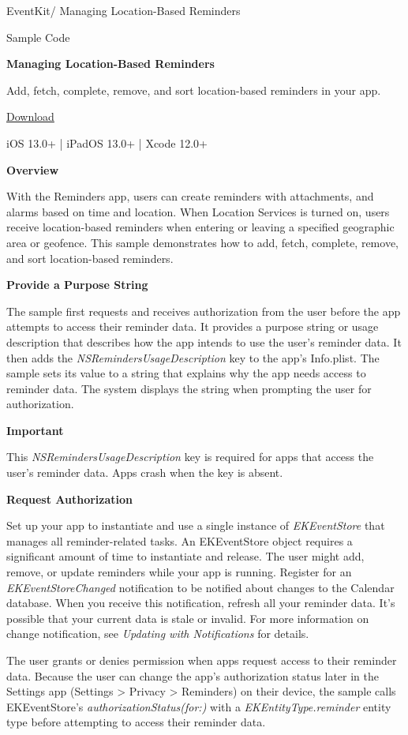 \documentclass{article}
\title{}
\author{}
\date{}
\begin{document}
EventKit/ Managing Location-Based Reminders

Sample Code

\textbf{Managing Location-Based Reminders}

Add, fetch, complete, remove, and sort location-based reminders in your app.

\href{https://example.com}{Download}

iOS 13.0+ | iPadOS 13.0+ | Xcode 12.0+

\textbf{Overview}

With the Reminders app, users can create reminders with attachments, and alarms based on time and location. When Location Services is turned on, users receive location-based reminders when entering or leaving a specified geographic area or geofence. This sample demonstrates how to add, fetch, complete, remove, and sort location-based reminders.

\textbf{Provide a Purpose String}

The sample first requests and receives authorization from the user before the app attempts to access their reminder data. It provides a purpose string or usage description that describes how the app intends to use the user's reminder data. It then adds the \textit{NSRemindersUsageDescription} key to the app's Info.plist. The sample sets its value to a string that explains why the app needs access to reminder data. The system displays the string when prompting the user for authorization.

\textbf{Important}

This \textit{NSRemindersUsageDescription} key is required for apps that access the user's reminder data. Apps crash when the key is absent.

\textbf{Request Authorization}

Set up your app to instantiate and use a single instance of \textit{EKEventStore} that manages all reminder-related tasks. An EKEventStore object requires a significant amount of time to instantiate and release. The user might add, remove, or update reminders while your app is running. Register for an \textit{EKEventStoreChanged} notification to be notified about changes to the Calendar database. When you receive this notification, refresh all your reminder data. It's possible that your current data is stale or invalid. For more information on change notification, see \textit{Updating with Notifications} for details.

The user grants or denies permission when apps request access to their reminder data. Because the user can change the app's authorization status later in the Settings app (Settings > Privacy > Reminders) on their device, the sample calls EKEventStore's \textit{authorizationStatus(for:)} with a \textit{EKEntityType.reminder} entity type before attempting to access their reminder data.
\end{document}
